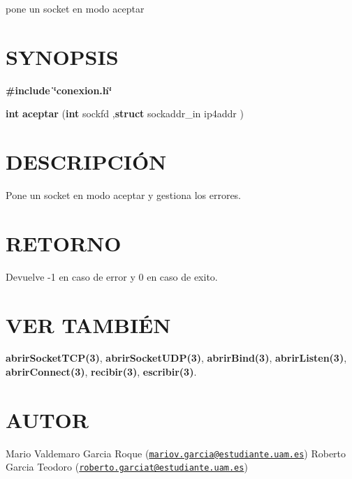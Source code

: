 pone un socket en modo aceptar\hypertarget{cerrar_canal__s_s_l_SYNOPSIS}{}\section{S\-Y\-N\-O\-P\-S\-I\-S}\label{cerrar_canal__s_s_l_SYNOPSIS}
{\bfseries \#include} {\bfseries \char`\"{}conexion.\-h\char`\"{}} 

{\bfseries int} {\bfseries aceptar} {\bfseries }({\bfseries int} sockfd ,{\bfseries struct} sockaddr\-\_\-in ip4addr {\bfseries })\hypertarget{cerrar_canal__s_s_l_descripcion}{}\section{D\-E\-S\-C\-R\-I\-P\-C\-IÓ\-N}\label{cerrar_canal__s_s_l_descripcion}
Pone un socket en modo aceptar y gestiona los errores.\hypertarget{cerrar_canal__s_s_l_retorno}{}\section{R\-E\-T\-O\-R\-N\-O}\label{cerrar_canal__s_s_l_retorno}
Devuelve -\/1 en caso de error y 0 en caso de exito.\hypertarget{cerrar_canal__s_s_l_seealso}{}\section{V\-E\-R T\-A\-M\-B\-IÉ\-N}\label{cerrar_canal__s_s_l_seealso}
{\bfseries abrir\-Socket\-T\-C\-P(3)}, {\bfseries abrir\-Socket\-U\-D\-P(3)}, {\bfseries abrir\-Bind(3)}, {\bfseries abrir\-Listen(3)}, {\bfseries abrir\-Connect(3)}, {\bfseries recibir(3)}, {\bfseries escribir(3)}.\hypertarget{cerrar_canal__s_s_l_authors}{}\section{A\-U\-T\-O\-R}\label{cerrar_canal__s_s_l_authors}
Mario Valdemaro Garcia Roque (\href{mailto:mariov.garcia@estudiante.uam.es}{\tt mariov.\-garcia@estudiante.\-uam.\-es}) Roberto Garcia Teodoro (\href{mailto:roberto.garciat@estudiante.uam.es}{\tt roberto.\-garciat@estudiante.\-uam.\-es}) 